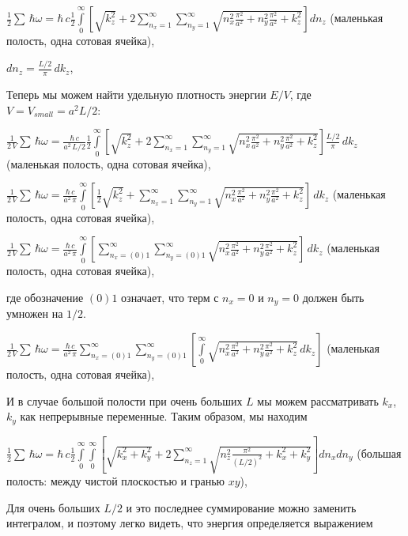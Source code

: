 \documentclass[11pt]{article}
\begin{document}
    \(\frac{1}{2}\sum\,\hbar\omega = \hbar\,c\frac{1}{2}\int\limits_{0}^{\infty}\left[{\sqrt{k_z^2}+2\sum\limits_{n_x=1}^{\infty}\sum\limits_{n_y=1}^{\infty}\sqrt{n_x^2\frac{\pi^2}{a^2}+n_y^2\frac{\pi^2}{a^2}+k_z^2}}\right]d{n_z}\)
(маленькая полость, одна сотовая ячейка),

    \(dn_z = \frac{L/2}{\pi}\,dk_z\),

    Теперь мы можем найти удельную плотность энергии \(E/V\), где
\(V = V_{small} = a^2 L/2\):

    \(\frac{1}{2\,V}\sum\,\hbar\omega = \frac{\hbar\,c}{a^2\,L/2}\frac{1}{2}\int\limits_{0}^{\infty}\left[{\sqrt{k_z^2}+2\sum\limits_{n_x=1}^{\infty}\sum\limits_{n_y=1}^{\infty}\sqrt{n_x^2\frac{\pi^2}{a^2}+n_y^2\frac{\pi^2}{a^2}+k_z^2}}\right]\frac{L/2}{\pi}\,dk_z\)
(маленькая полость, одна сотовая ячейка),

    \(\frac{1}{2\,V}\sum\,\hbar\omega = \frac{\hbar\,c}{a^2\,\pi}\int\limits_{0}^{\infty}\left[{\frac{1}{2}\sqrt{k_z^2}+\sum\limits_{n_x=1}^{\infty}\sum\limits_{n_y=1}^{\infty}\sqrt{n_x^2\frac{\pi^2}{a^2}+n_y^2\frac{\pi^2}{a^2}+k_z^2}}\right]\,dk_z\)
(маленькая полость, одна сотовая ячейка),

    \(\frac{1}{2\,V}\sum\,\hbar\omega = \frac{\hbar\,c}{a^2\,\pi}\int\limits_{0}^{\infty}\left[{\sum\limits_{n_x=(0)1}^{\infty}\sum\limits_{n_y=(0)1}^{\infty}\sqrt{n_x^2\frac{\pi^2}{a^2}+n_y^2\frac{\pi^2}{a^2}+k_z^2}}\right]\,dk_z\)
(маленькая полость, одна сотовая ячейка),

    где обозначение \(\left(0\right) 1\) означает, что терм с \(n_x = 0\) и
\(n_y = 0\) должен быть умножен на \(1\big/2\).

    \(\frac{1}{2\,V}\sum\,\hbar\omega = \frac{\hbar\,c}{a^2\,\pi}\sum\limits_{n_x=(0)1}^{\infty}\sum\limits_{n_y=(0)1}^{\infty}\left[\int\limits_{0}^{\infty}\sqrt{n_x^2\frac{\pi^2}{a^2}+n_y^2\frac{\pi^2}{a^2}+k_z^2}\,dk_z\right]\)
(маленькая полость, одна сотовая ячейка),

    И в случае большой полости при очень больших \(L\) мы можем
рассматривать \(k_x\), \(k_y\) как непрерывные переменные. Таким
образом, мы находим

    \(\frac{1}{2}\sum\,\hbar\omega = \hbar\,c\frac{1}{2}\int\limits_{0}^{\infty}\int\limits_{0}^{\infty}\left[{\sqrt{k_x^2+k_y^2}+2\sum\limits_{n_z=1}^{\infty}\sqrt{n_z^2\frac{\pi^2}{(L/2)^2}+k_x^2+k_y^2}}\right]d{n_x}d{n_y}\)
(большая полость: между чистой плоскостью и гранью \(xy\)),

    Для очень больших \(L/2\) и это последнее суммирование можно заменить
интегралом, и поэтому легко видеть, что энергия определяется выражением
\end{document}
